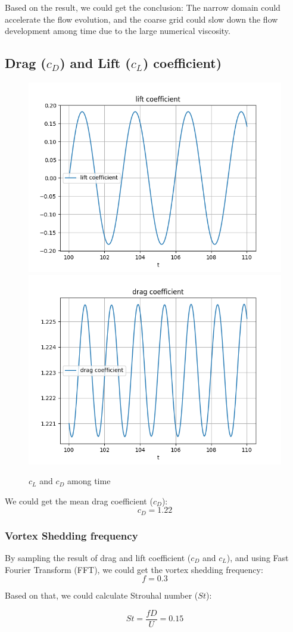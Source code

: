 \documentclass[12pt]{article}
\begin{document}
Based on the result, we could get the conclusion: The narrow domain could accelerate the flow evolution, and the coarse grid could slow down the flow development among time due to the large numerical viscosity.




\subsection{Drag ($c_D$) and Lift ($c_L$) coefficient)}

\begin{figure}[H]
    \centering
    \includegraphics[width=0.45\linewidth]{figure/Analysis/N16Re150_8x4/cl_N16Re150_8x4.jpg}
    \includegraphics[width=0.45\linewidth]{figure/Analysis/N16Re150_8x4/cd_N16Re150_8x4.jpg}
    \caption{$c_L$ and $c_D$ among time}
\end{figure}

We could get the mean drag coefficient ($c_D$):
$$c_D = 1.22$$


\subsubsection{Vortex Shedding frequency}

By sampling the result of drag and lift coefficient ($c_D$ and $c_L$), and using Fast Fourier Transform (FFT), we could get the vortex shedding frequency:
$$f = 0.3$$

Based on that, we could calculate Strouhal number ($St$):

$$St = \frac{f D}{U} = 0.15 $$
\end{document}
